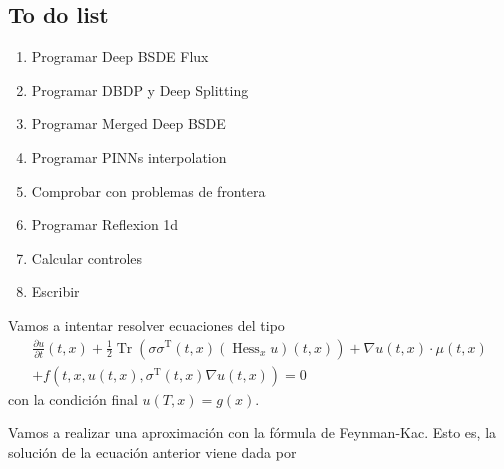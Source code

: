\documentclass{article}
\begin{document}
\subsection*{To do list}
\begin{enumerate}
	\item Programar Deep BSDE Flux
	\item Programar DBDP y Deep Splitting 
	\item Programar Merged Deep BSDE
	\item Programar PINNs interpolation
	\item Comprobar con problemas de frontera
	\item Programar Reflexion 1d
	\item Calcular controles
	\item Escribir
\end{enumerate}
	Vamos a intentar resolver ecuaciones del tipo 
	\begin{equation}
		\begin{gathered}
			\frac{\partial u}{\partial t}(t, x)+\frac{1}{2} \operatorname{Tr}\left(\sigma \sigma^{\mathrm{T}}(t, x)\left(\operatorname{Hess}_x u\right)(t, x)\right)+\nabla u(t, x) \cdot \mu(t, x) \\
			+f\left(t, x, u(t, x), \sigma^{\mathrm{T}}(t, x) \nabla u(t, x)\right)=0
		\end{gathered}
	\end{equation}
con la condición final $u(T,x)=g(x)$.

Vamos a realizar una aproximación con la fórmula de Feynman-Kac. Esto es, la solución de la ecuación anterior viene dada por 
\end{document}
